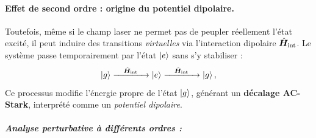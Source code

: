 \medskip


\paragraph{Effet de second ordre : origine du potentiel dipolaire.}

\noindent Toutefois, même si le champ laser ne permet pas de peupler réellement l’état excité, il peut induire des transitions \emph{virtuelles} via l’interaction dipolaire \(  \hat{\bm{H}}_{\text{int}} \). Le système passe temporairement par l’état \( \ket{e} \) sans s’y stabiliser :
\begin{equation}
\ket{g} \xrightarrow{\quad \hat{\bm{H}}_{\text{int}} \quad} \ket{e} \xrightarrow{\quad \hat{\bm{H}}_{\text{int}} \quad} \ket{g},
\end{equation}
Ce processus modifie l’énergie propre de l’état \( \ket{g} \), générant un \textbf{décalage AC-Stark}, interprété comme un \emph{potentiel dipolaire}.

\bigskip

\subparagraph{Analyse perturbative à différents ordres :}

